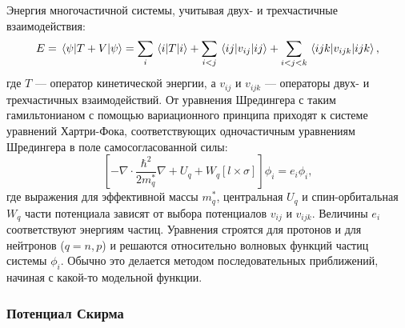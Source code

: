 Энергия многочастичной системы, учитывая двух- и трехчастичные взаимодействия:
\begin{equation}
E = \expval{T + V}{\psi} = \sum_i \expval{T}{i} 
  + \sum_{i < j} \expval{v_{ij}}{ij} 
  + \sum_{i < j < k} \expval{v_{ijk}}{ijk}, 
\end{equation}
где $T$ --- оператор кинетической энергии, а $v_{ij}$ и $v_{ijk}$ --- операторы двух- и трехчастичных взаимодействий. От уравнения Шредингера с таким гамильтонианом с помощью вариационного принципа приходят к системе уравнений Хартри-Фока, соответствующих одночастичным уравнениям Шредингера в поле самосогласованной силы:
\begin{equation}
\left[ - \nabla \cdot \frac{\hbar^2}{2m_q^*} \nabla + U_q
+ W_q \left[l \times \sigma\right]\right] \phi_i = e_i \phi_i,
\end{equation}
где выражения для эффективной массы $m^*_q$, центральная $U_q$ и спин-орбитальная $W_q$ части потенциала зависят от выбора потенциалов $v_{ij}$ и $v_{ijk}$. Величины $e_i$ соответствуют энергиям частиц. Уравнения строятся для протонов и для нейтронов ($q = n, p$) и решаются относительно волновых функций частиц системы $\phi_i$. Обычно это делается методом последовательных приближений, начиная с какой-то модельной функции.

\subsubsection{Потенциал Скирма}
